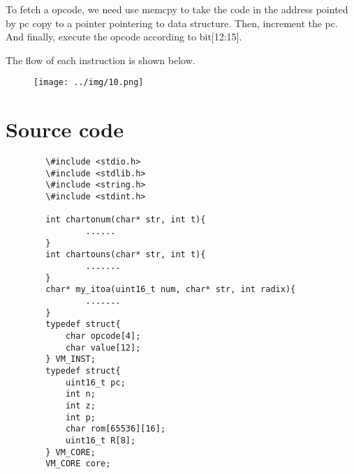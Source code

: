 \documentclass[20pt]{ctexart}
\begin{document}
To fetch a opcode, we need use memcpy to take the code in the address pointed by pc copy to a pointer pointering to data structure.
Then, increment the pc. And finally, execute the opcode according to bit[12:15].

The flow of each instruction is shown below.
\begin{figure}[H]
        \centering
        \texttt{[image: ../img/10.png]}
      \end{figure}

\section{Source code}
\linespread{0.9}     
\begin{verbatim}
        \#include <stdio.h>
        \#include <stdlib.h>
        \#include <string.h>
        \#include <stdint.h>
        
        int chartonum(char* str, int t){
                ......
        }
        int chartouns(char* str, int t){
                .......
        }
        char* my_itoa(uint16_t num, char* str, int radix){
                .......
        }
        typedef struct{
            char opcode[4];
            char value[12];
        } VM_INST;
        typedef struct{
            uint16_t pc;
            int n;
            int z;
            int p;
            char rom[65536][16];
            uint16_t R[8];
        } VM_CORE;
        VM_CORE core;


\end{verbatim}
\end{document}
